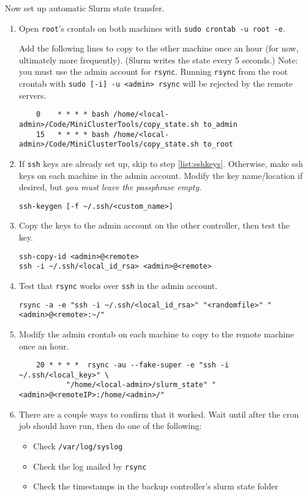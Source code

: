 \noindent Now set up automatic Slurm state transfer.

\begin{enumerate}
  \item Open \texttt{root}'s crontab on both machines with \texttt{sudo crontab -u root -e}.

    Add the following lines to copy to the other machine once an hour (for now, ultimately more frequently). (Slurm writes the state every 5 seconds.) Note: you must use the admin account for \texttt{rsync}. Running \texttt{rsync} from the root crontab with \texttt{sudo [-i] -u <admin> rsync} will be rejected by the remote servers.
	\begin{verbatim}
	0    * * * * bash /home/<local-admin>/Code/MiniClusterTools/copy_state.sh to_admin
	15   * * * * bash /home/<local-admin>/Code/MiniClusterTools/copy_state.sh to_root
	\end{verbatim}

  \item If \texttt{ssh} keys are already set up, skip to step \ref{list:sshkeys}. Otherwise, make ssh keys on each machine in the admin account. Modify the key name/location if desired, but \emph{you must leave the passphrase empty}. 

    \texttt{ssh-keygen [-f \textasciitilde /.ssh/<custom\_name>]}

  \item Copy the keys to the admin account on the other controller, then test the key.

    \texttt{ssh-copy-id <admin>@<remote>} \\
    \texttt{ssh -i \textasciitilde /.ssh/<local\_id\_rsa> <admin>@<remote>}

  \item Test that \texttt{rsync} works over \texttt{ssh} in the admin account.

    \texttt{rsync -a -e "ssh -i \textasciitilde /.ssh/<local\_id\_rsa>" "<randomfile>" "<admin>@<remote>:\textasciitilde /"}

  \item \label{list:sshkeys} Modify the admin crontab on each machine to copy to the remote machine once an hour.

	\begin{verbatim}
	20 * * * *  rsync -au --fake-super -e "ssh -i ~/.ssh/<local_key>" \
	       "/home/<local-admin>/slurm_state" "<admin>@<remoteIP>:/home/<admin>/"
	\end{verbatim}

  \item There are a couple ways to confirm that it worked. Wait until after the cron job should have run, then do one of the following:
    \begin{itemize}
      \item Check \texttt{/var/log/syslog}
      \item Check the log mailed by \texttt{rsync}
      \item Check the timestamps in the backup controller's slurm state folder
    \end{itemize}


\end{enumerate}
